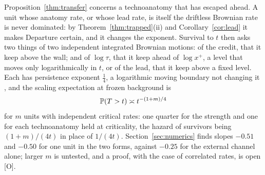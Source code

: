 \begin{remark}\label{rem:addexp}
Proposition~\ref{thm:transfer} concerns a technoanatomy that has escaped
ahead. A unit whose anatomy rate, or whose lead rate, is itself the
driftless Brownian rate is never dominated: by
Theorem~\ref{thm:trapped}(ii) and Corollary~\ref{cor:lead} it makes
Departure certain, and it changes the exponent. Survival to $t$ then asks
two things of two independent integrated Brownian motions: of the credit,
that it keep above the wall; and of $\log\tau$, that it keep ahead of
$\log x^+$, a level that moves only logarithmically in $t$, or of the
lead, that it keep above a fixed level. Each has persistence exponent
$\tfrac14$, a logarithmic moving boundary not changing it
\cite{AS15,DW15}, and the scaling expectation at frozen background is
\begin{equation}\label{eq:addexp}
\mathbb{P}(T>t)\asymp t^{-(1+m)/4}
\end{equation}
for $m$ units with independent critical rates: one quarter for the
strength and one for each technoanatomy held at criticality, the hazard
of survivors being $(1+m)/(4t)$ in place of $1/(4t)$.
Section~\ref{sec:numerics} finds slopes $-0.51$ and $-0.50$ for one unit
in the two forms, against $-0.25$ for the external channel alone; larger
$m$ is untested, and a proof, with the case of correlated rates, is open
[O].
\end{remark}

